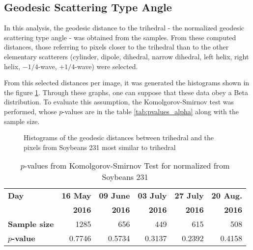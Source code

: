 \documentclass[journal]{IEEEtran}
\begin{document}

\subsection{Geodesic Scattering Type Angle}

In this analysis, the geodesic distance to the trihedral - the normalized geodesic scattering type angle - was obtained from the samples. From these computed distances, those referring to pixels closer to the trihedral than to the other elementary scatterers (cylinder, dipole, dihedral, narrow dihedral, left helix, right helix, $-1/4$-wave, $+1/4$-wave) were selected.

From this selected distances per image, it was generated the histograms shown in the figure \ref{fig:histograms_alpha_sb231}. Through these graphs, one can suppose that these data obey a Beta distribution. To evaluate this assumption, the Komolgorov-Smirnov test was performed, whose $p$-values are in the table \ref{tab:pvalues_alpha} along with the sample size.

\begin{figure}[hbt]
\centering
{}
\caption{Histograms of the geodesic distances between trihedral and the pixels from Soybeans 231 most similar to trihedral}
\label{fig:histograms_alpha_sb231}
\end{figure}

\begin{table}[hbt]
  \centering
  \caption{$p$-values from Komolgorov-Smirnov Test for normalized from Soybeans 231}
  \label{tab:pvalues_alpha_sb231}
  \begin{tabular}{lrrrrr}
    \toprule
    \textbf{Day} & \textbf{16 May} & \textbf{09 June} & \textbf{03 July} & \textbf{27 July} & \textbf{20 Aug.}\\ 
                 & \textbf{2016} & \textbf{2016} & \textbf{2016} & \textbf{2016} & \textbf{2016}\\\midrule
    \textbf{Sample size} & 1285 & 656 & 449 & 615 & 508\\
    \textbf{$p$-value} & 0.7746 & 0.5734 & 0.3137 & 0.2392 & 0.4158\\
    \bottomrule
  \end{tabular}
\end{table}
\end{document}
